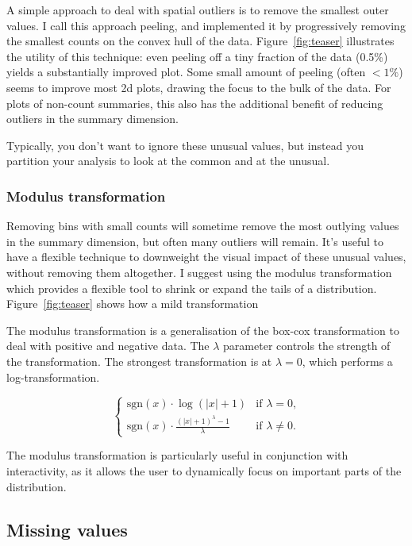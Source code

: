 \documentclass[journal]{vgtc}                %
\begin{document}
A simple approach to deal with spatial outliers is to remove the smallest outer values. I call this approach peeling, and implemented it by progressively removing the smallest counts on the convex hull of the data. Figure~\ref{fig:teaser} illustrates the utility of this technique: even peeling off a tiny fraction of the data (0.5\%) yields a substantially improved plot. Some small amount of peeling (often $< 1\%$) seems to improve most 2d plots, drawing the focus to the bulk of the data. For plots of non-count summaries, this also has the additional benefit of reducing outliers in the summary dimension. 

Typically, you don't want to ignore these unusual values, but instead you partition your analysis to look at the common and at the unusual.

\subsubsection{Modulus transformation}
\label{sub:mt}

Removing bins with small counts will sometime remove the most outlying values in the summary dimension, but often many outliers will remain. It's useful to have a flexible technique to downweight the visual impact of these unusual values, without removing them altogether.  I suggest using the modulus transformation which provides a flexible tool to shrink or expand the tails of a distribution. Figure~\ref{fig:teaser} shows how a mild transformation 

The modulus transformation \citep{john:1980} is a generalisation of the box-cox transformation \citep{box:1964} to deal with positive and negative data. The $\lambda$ parameter controls the strength of the transformation. The strongest transformation is at $\lambda = 0$, which performs a log-transformation. 

\begin{equation}
\begin{cases} 
  \text{sgn}(x) \cdot \log(|x| + 1) & \text{if $\lambda = 0$,} \\
  \text{sgn}(x) \cdot \frac{(|x| + 1)^\lambda - 1}{\lambda} &\text{if $\lambda \ne 0$.}
\end{cases}
\end{equation}

The modulus transformation is particularly useful in conjunction with interactivity, as it allows the user to dynamically focus on important parts of the distribution.

\subsection{Missing values}
\label{sub:missing}
\end{document}
